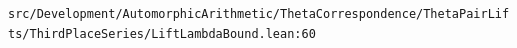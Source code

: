 \nolinkurl{src/Development/AutomorphicArithmetic/ThetaCorrespondence/ThetaPairLifts/ThirdPlaceSeries/LiftLambdaBound.lean:60}%
